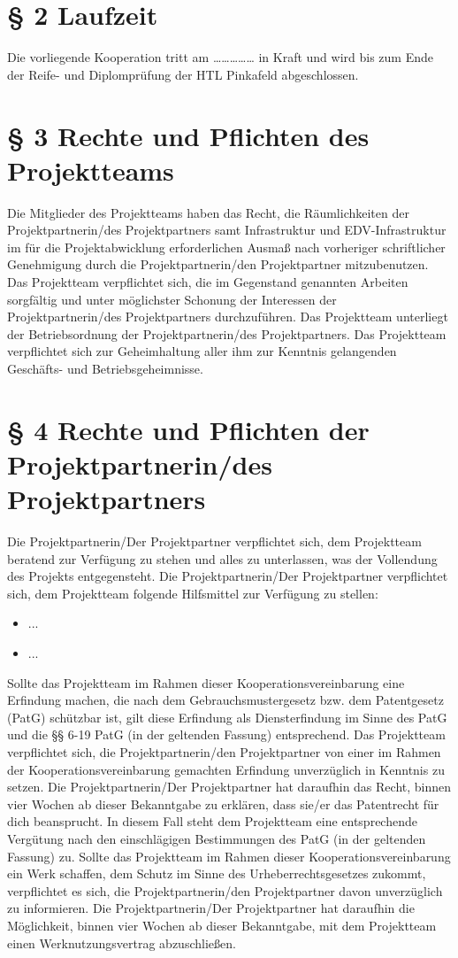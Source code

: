 \section*{§ 2 Laufzeit}
Die vorliegende Kooperation tritt am …………… in Kraft und wird bis zum Ende der Reife- und Diplomprüfung der HTL Pinkafeld abgeschlossen. 

\section*{§ 3 Rechte und Pflichten des Projektteams}
Die Mitglieder des Projektteams haben das Recht, die Räumlichkeiten der Projektpartnerin/des Projektpartners samt Infrastruktur und EDV-Infrastruktur im für die Projektabwicklung erforderlichen Ausmaß nach vorheriger schriftlicher Genehmigung durch die Projektpartnerin/den Projektpartner mitzubenutzen. Das Projektteam verpflichtet sich, die im Gegenstand genannten Arbeiten sorgfältig und unter möglichster Schonung der Interessen der Projektpartnerin/des Projektpartners durchzuführen. Das Projektteam unterliegt der Betriebsordnung der Projektpartnerin/des Projektpartners. Das Projektteam verpflichtet sich zur Geheimhaltung aller ihm zur Kenntnis gelangenden Geschäfts- und Betriebsgeheimnisse. 

\section*{§ 4 Rechte und Pflichten der Projektpartnerin/des Projektpartners}
Die Projektpartnerin/Der Projektpartner verpflichtet sich, dem Projektteam beratend zur Verfügung zu stehen und alles zu unterlassen, was der Vollendung des Projekts entgegensteht. Die Projektpartnerin/Der Projektpartner verpflichtet sich, dem Projektteam folgende Hilfsmittel zur Verfügung zu stellen: 
\begin{itemize}
    \item ...
    \item ...
\end{itemize}

Sollte das Projektteam im Rahmen dieser Kooperationsvereinbarung eine Erfindung machen, die nach dem Gebrauchsmustergesetz bzw. dem Patentgesetz (PatG) schützbar ist, gilt diese Erfindung als Diensterfindung im Sinne des PatG und die §§ 6-19 PatG (in der geltenden Fassung) entsprechend. Das Projektteam verpflichtet sich, die Projektpartnerin/den Projektpartner von einer im Rahmen der Kooperationsvereinbarung gemachten Erfindung unverzüglich in Kenntnis zu setzen. Die Projektpartnerin/Der Projektpartner hat daraufhin das Recht, binnen vier Wochen ab dieser Bekanntgabe zu erklären, dass sie/er das Patentrecht für dich beansprucht. In diesem Fall steht dem Projektteam eine entsprechende Vergütung nach den einschlägigen Bestimmungen des PatG (in der geltenden Fassung) zu. Sollte das Projektteam im Rahmen dieser Kooperationsvereinbarung ein Werk schaffen, dem Schutz im Sinne des Urheberrechtsgesetzes zukommt, verpflichtet es sich, die Projektpartnerin/den Projektpartner davon unverzüglich zu informieren. Die Projektpartnerin/Der Projektpartner hat daraufhin die Möglichkeit, binnen vier Wochen ab dieser Bekanntgabe, mit dem Projektteam einen Werknutzungsvertrag abzuschließen. 

